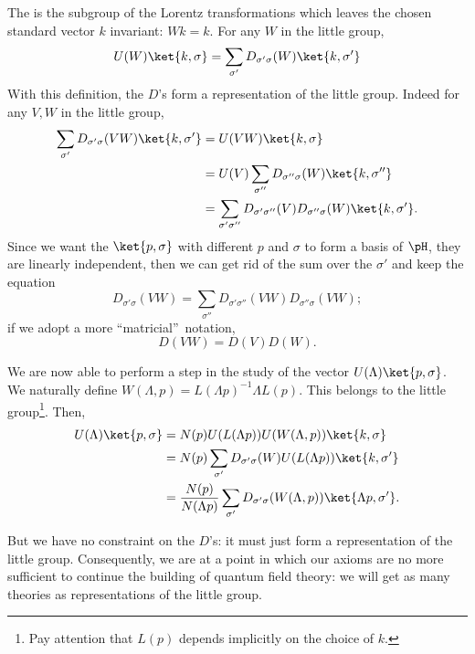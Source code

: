 The  is the subgroup of the Lorentz transformations which leaves the chosen standard vector $k$ invariant: $Wk=k$. For any $W$ in the little group,
\[
   U(W)\ket{k,\sigma}=\sum_{\sigma'}D_{\sigma'\sigma}(W)\ket{k,\sigma'}
\]
With this definition, the $D$'s form a representation of the little group. Indeed for any $V,W$ in the little group,
\begin{equation}
\begin{split}
  \sum_{\sigma'}D_{\sigma'\sigma}(VW)\ket{k,\sigma'}&=U(VW)\ket{k,\sigma}\\
                                    &=U(V)\sum_{\sigma''}D_{\sigma''\sigma}(W)\ket{k,\sigma''}\\
				    &=\sum_{\sigma'\sigma''}D_{\sigma'\sigma''}(V)D_{\sigma''\sigma}(W)
				      \ket{k,\sigma'}.
\end{split}
\end{equation}
Since we want the $\ket{p,\sigma}$ with different $p$ and $\sigma$ to form a basis of $\pH$, they are linearly independent, then we can get rid of the sum over the $\sigma'$ and keep the equation
\[
D_{\sigma'\sigma}(VW)=\sum_{\sigma''}D_{\sigma'\sigma''}(VW)D_{\sigma''\sigma}(VW);
\]
if we adopt a more ``matricial''\ notation,
\begin{equation}
D(VW)=D(V)D(W).
\end{equation}

We are now able to perform a step in the study of the vector $U(\Lambda)\ket{p,\sigma}$. We naturally define $W(\Lambda,p)=L(\Lambda p)^{-1}\Lambda L(p)$. This belongs to the little group\footnote{Pay attention that $L(p)$ depends implicitly on the choice of $k$.}. Then,
\begin{equation}
\begin{split}
  U(\Lambda)\ket{p,\sigma}&=N(p)U(L(\Lambda p))U(W(\Lambda,p))\ket{k,\sigma}\\
                          &=N(p)\sum_{\sigma'}D_{\sigma'\sigma}(W)U(L(\Lambda p))\ket{k,\sigma'}\\
			  &=\frac{N(p)}{N(\Lambda p)}\sum_{\sigma'}D_{\sigma'\sigma}(W(\Lambda,p))
			      \ket{\Lambda p,\sigma'}.
\end{split}
\end{equation}

But we have no constraint on the $D$'s: it must just form a representation of the little group. Consequently, we are at a point in which our axioms are no more sufficient to continue the building of quantum field theory: we will get as many theories as representations of the little group.

